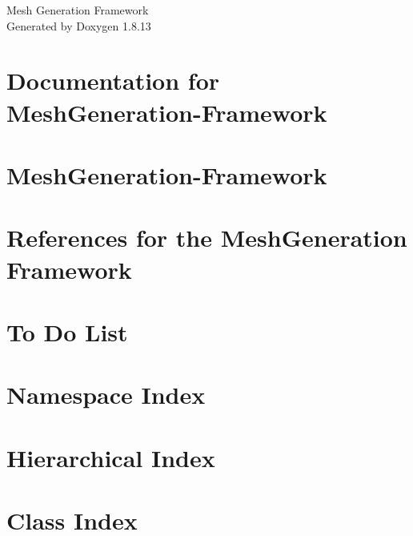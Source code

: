 \documentclass[twoside]{book}
\newcommand{\+}{\discretionary{\mbox{\scriptsize$\hookleftarrow$}}{}{}}
\newcommand{\clearemptydoublepage}{%
  \newpage{\pagestyle{empty}\cleardoublepage}%
}
\begin{document}
\hypersetup{pageanchor=false,
             bookmarksnumbered=true,
             pdfencoding=unicode
            }
\begin{titlepage}
\vspace*{7cm}
\begin{center}%
{\Large Mesh Generation Framework }\\
\vspace*{1cm}
{\large Generated by Doxygen 1.8.13}\\
\end{center}
\end{titlepage}
\clearemptydoublepage
{}
\tableofcontents
\clearemptydoublepage
{}
\hypersetup{pageanchor=true}

\chapter{Documentation for Mesh\+Generation-\/\+Framework}
\label{md_doc_README}

\chapter{Mesh\+Generation-\/\+Framework}
\label{md_README}

\chapter{References for the Mesh\+Generation Framework}
\label{md_references_README}

\chapter{To Do List}
\label{md_src_mesh_formats_README}

\chapter{Namespace Index}

\chapter{Hierarchical Index}

\chapter{Class Index}

\end{document}

